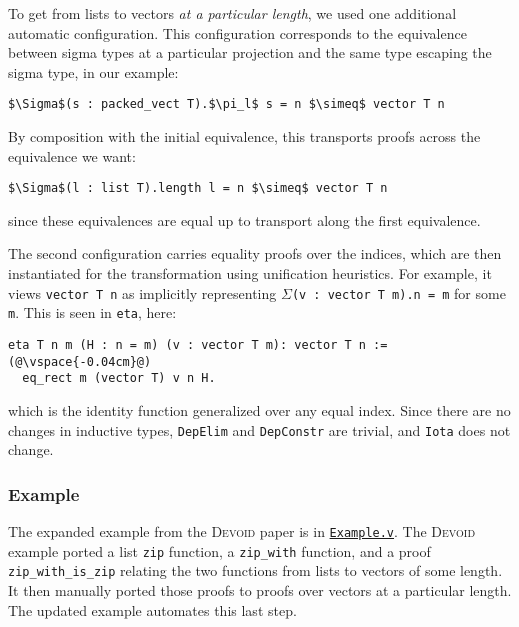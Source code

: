 To get from lists to vectors \textit{at a particular length}, we used one additional automatic configuration.
This configuration corresponds to the equivalence between sigma types at a particular projection
and the same type escaping the sigma type, in our example:

\begin{lstlisting}
$\Sigma$(s : packed_vect T).$\pi_l$ s = n $\simeq$ vector T n
\end{lstlisting}
By composition with the initial equivalence, this transports proofs
across the equivalence we want:

\begin{lstlisting}
$\Sigma$(l : list T).length l = n $\simeq$ vector T n
\end{lstlisting}
since these equivalences are equal up to transport along the first equivalence.

The second configuration carries equality proofs over the indices,
which are then instantiated for the transformation using unification heuristics.
For example, it views \lstinline{vector T n} as implicitly representing $\Sigma$\lstinline{(v : vector T m).n = m} for some \lstinline{m}.
This is seen in \lstinline{eta}, here: 

\begin{lstlisting}[backgroundcolor=\color{cyan!30}]
eta T n m (H : n = m) (v : vector T m): vector T n :=(@\vspace{-0.04cm}@)
  eq_rect m (vector T) v n H.
\end{lstlisting}
which is the identity function generalized over any equal index.
Since there are no changes in inductive types, \lstinline{DepElim} and \lstinline{DepConstr} are trivial,
and \lstinline{Iota} does not change.


\subsubsection{Example}

The expanded example from the \textsc{Devoid} paper is in \href{https://github.com/uwplse/pumpkin-pi/blob/master/plugin/coq/examples/Example.v}{\lstinline{Example.v}}.
The \textsc{Devoid} example ported a list \lstinline{zip} function,
a \lstinline{zip_with} function, and a proof \lstinline{zip_with_is_zip} relating the two
functions from lists to vectors of some length.
It then manually ported those proofs to proofs over vectors at a particular length.
The updated \toolname example automates this last step.


